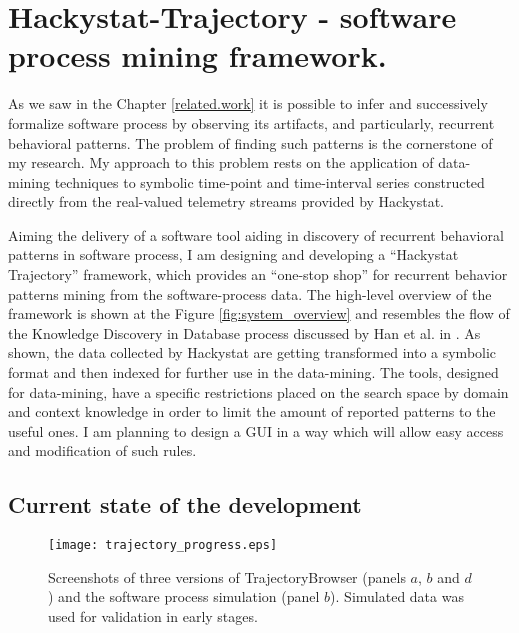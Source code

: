 \chapter{Hackystat-Trajectory - software process mining framework.} \label{trajectory}
As we saw in the Chapter \ref{related.work} it is possible to infer and successively formalize software process by observing its artifacts, and particularly, recurrent behavioral patterns. The problem of finding such patterns is the cornerstone of my research. My approach to this problem rests on the application of data-mining techniques to symbolic time-point and time-interval series constructed directly from the real-valued telemetry streams provided by Hackystat.

Aiming the delivery of a software tool aiding in discovery of recurrent behavioral patterns in software process, I am designing and developing a ``Hackystat Trajectory'' framework, which provides an ``one-stop shop'' for recurrent behavior patterns mining from the software-process data. The high-level overview of the framework is shown at the Figure \ref{fig:system_overview} and resembles the flow of the Knowledge Discovery in Database process discussed by Han et al. in \cite{citeulike:709476}. As shown, the data collected by Hackystat are getting transformed into a symbolic format and then indexed for further use in the data-mining. The tools, designed for data-mining, have a specific restrictions placed on the search space by domain and context knowledge in order to limit the amount of reported patterns to the useful ones. I am planning to design a GUI in a way which will allow easy access and modification of such rules. 

\section{Current state of the development}

\begin{figure}[tbp]
   \centering
   \texttt{[image: trajectory\_progress.eps]}
   \caption{Screenshots of three versions of TrajectoryBrowser (panels $a$, $b$ and $d$) and the software process simulation (panel $b$). Simulated data was used for validation in early stages.}
   \label{fig:trajectory_progress}
\end{figure}

